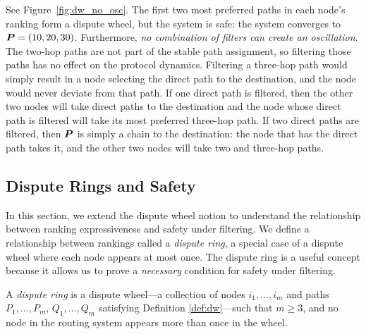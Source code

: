 \begin{example}
\label{ex:dw_no_osc}
See Figure~\ref{fig:dw_no_osc}.  The
first two most preferred paths in each node's ranking form
a dispute wheel, but the system is safe: the system converges to $\boldsymbol{P}
= (10, 20, 30)$.  Furthermore, {\em no combination of filters can create an
oscillation}.  The two-hop paths are not part of the stable path
assignment, so filtering those paths has no effect on the protocol
dynamics.  Filtering a three-hop path would simply result in a node
selecting the direct path to the destination, and the node would never
deviate from that path.  If one
direct path is filtered, then the other two nodes will take direct paths
to the destination and the node whose direct path is filtered will take
its most preferred three-hop path.  If two direct paths are filtered,
then $\boldsymbol{P}$ is simply a chain to the destination: the node that has the
direct path takes it, and the other two nodes will take two and
three-hop paths.
\end{example}

\subsection{Dispute Rings and Safety}

In this section, we extend the dispute wheel notion to understand the
relationship between ranking 
expressiveness and safety under filtering.  We define a relationship
between rankings called a {\em dispute ring}, a special case of a
dispute wheel where each node appears at most once.
The dispute ring is a useful concept because it allows us to prove a
{\em necessary} condition for safety under filtering.


\begin{defn}
\label{def:dr}
A {\em dispute ring} is a dispute wheel---a collection of nodes
$i_1, \ldots, i_m$ and paths $P_1, \ldots, P_m$, $Q_1, \ldots, Q_m$
satisfying Definition \ref{def:dw}---such that $m \geq 3$, and no node in
the routing system appears more than once in the wheel.
\end{defn}


